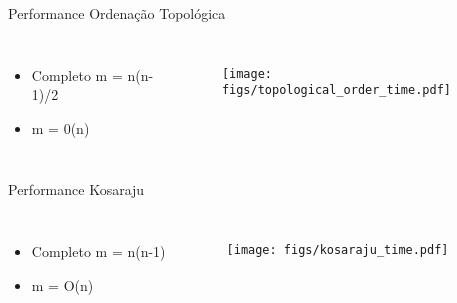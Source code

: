 \documentclass[aspectratio=169,usenames,dvipsnames]{beamer}
\begin{document}
\begin{frame}{Performance Ordenação Topológica}
  \begin{columns}
    
    \begin{itemize}
      \item Completo m = n(n-1)/2 
      \item m = 0(n)
    \end{itemize}


    \begin{figure}[ht]
    \centering
    \texttt{[image: figs/topological\_order\_time.pdf]}
    \end{figure}

  \end{columns}
\end{frame}

\begin{frame}{Performance Kosaraju}
  \begin{columns}
    
    \vfill
    \begin{itemize}
      \item Completo m = n(n-1) 
      \item m = O(n)
    \end{itemize}
    \vfill


    \begin{figure}[ht]
    \centering
    \texttt{[image: figs/kosaraju\_time.pdf]}
    \end{figure}

  \end{columns}
\end{frame}
\end{document}
